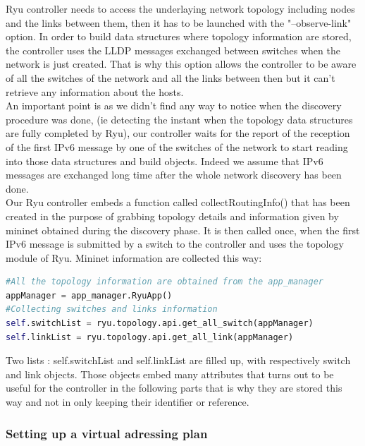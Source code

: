 \documentclass{article}
\begin{document}
Ryu controller needs to access the underlaying network topology
including nodes and the links between them, then it has to be launched
with the "--observe-link" option. In order to build data structures
where topology information are stored, the controller uses the LLDP
messages exchanged between switches when the network is just
created. That is why this option allows the controller to be aware of
all the switches of the network and all the links between then but it
can't retrieve any information about the hosts.\\
\newline
An important point is as we didn't find any way to notice when the
discovery procedure was done, (ie detecting the instant when the
topology data structures are fully completed by Ryu), our controller
waits for the report of the reception of the first IPv6 message by one
of the switches of the network to start reading into those data
structures and build objects. Indeed we assume that IPv6 messages are
exchanged long time after the whole network discovery has been done.\\
\newline
Our Ryu controller embeds a function called collectRoutingInfo() that
has been created in the purpose of grabbing topology details and
information given by mininet obtained during the discovery phase.  It
is then called once, when the first IPv6 message is submitted by a
switch to the controller and uses the topology module of Ryu. Mininet
information are collected this way:

\begin{lstlisting}[frame=single,language=Python,breaklines=true] 
#All the topology information are obtained from the app_manager
appManager = app_manager.RyuApp()
#Collecting switches and links information
self.switchList = ryu.topology.api.get_all_switch(appManager)
self.linkList = ryu.topology.api.get_all_link(appManager)
\end{lstlisting}

Two lists : self.switchList and self.linkList are filled up, with
respectively switch and link objects. Those objects embed many
attributes that turns out to be useful for the controller in the
following parts that is why they are stored this way and not in only
keeping their identifier or reference.

\subsubsection{Setting up a virtual adressing plan}
\end{document}
